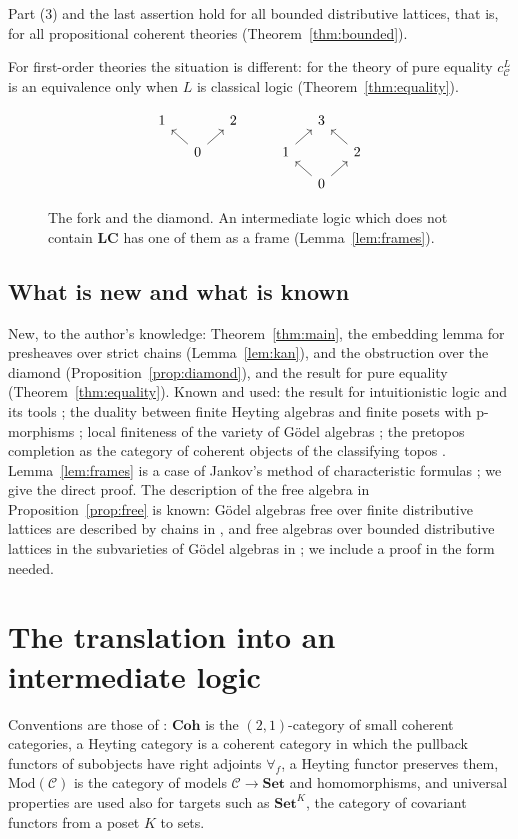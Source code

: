 \documentclass[11pt]{amsart}
\theoremstyle{definition}
\newcommand{\Coh}{\mathbf{Coh}}
\newcommand{\Mod}{\mathrm{Mod}}
\newcommand{\Set}{\mathbf{Set}}
\newcommand{\cC}{\mathcal C}
\newcommand{\LC}{\mathbf{LC}}
\begin{document}
Part (3) and the last assertion hold for all bounded distributive
lattices, that is, for all propositional coherent theories
(Theorem~\ref{thm:bounded}).

For first-order theories the situation is different: for the theory of
pure equality $c^L_\cC$ is an equivalence only when $L$ is classical
logic (Theorem~\ref{thm:equality}).

\begin{figure}[h]
\[
\begin{tikzcd}[column sep=small,row sep=small]
1&&2&&&3&\\
&0\arrow[ul]\arrow[ur]&&&1\arrow[ur]&&2\arrow[ul]\\
&&&&&0\arrow[ul]\arrow[ur]&
\end{tikzcd}
\]
\caption{The fork and the diamond. An intermediate logic which does not
contain $\LC$ has one of them as a frame (Lemma~\ref{lem:frames}).}
\end{figure}

\subsection*{What is new and what is known}
New, to the author's knowledge: Theorem~\ref{thm:main}, the embedding
lemma for presheaves over strict chains (Lemma~\ref{lem:kan}), and the
obstruction over the diamond (Proposition~\ref{prop:diamond}), and the
result for pure equality (Theorem~\ref{thm:equality}). Known
and used: the result for intuitionistic logic and its tools
\cite{Heyting}; the duality between finite Heyting algebras and finite
posets with p-morphisms \cite{CZ97}; local finiteness of the variety
of G\"odel algebras \cite{Horn69}; the pretopos completion as the
category of coherent objects of the classifying topos
\cite[D3.3]{Elephant}. Lemma~\ref{lem:frames} is a case of Jankov's
method of characteristic formulas \cite{CZ97}; we give the direct
proof. The description of the free algebra in
Proposition~\ref{prop:free} is known: G\"odel algebras free over
finite distributive lattices are described by chains in
\cite{AGM08}, and free algebras over bounded distributive lattices in
the subvarieties of G\"odel algebras in \cite{Carai}; we include a
proof in the form needed.

\section{The translation into an intermediate logic}\label{sec:HL}

Conventions are those of \cite{Heyting}: $\Coh$ is the
$(2,1)$-category of small coherent categories, a Heyting category is a
coherent category in which the pullback functors of subobjects have
right adjoints $\forall_f$, a Heyting functor preserves them, $\Mod(\cC)$
is the category of models $\cC\to\Set$ and homomorphisms, and universal
properties are used also for targets such as $\Set^K$, the category of
covariant functors from a poset $K$ to sets.
\end{document}
